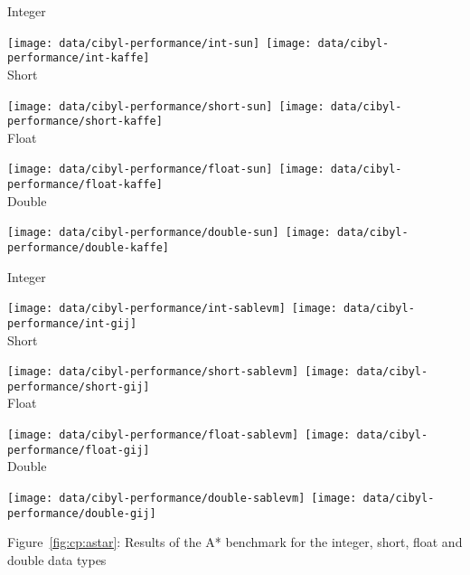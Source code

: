 \begin{figure*}[t]
  \begin{center}
    Integer

    \texttt{[image: data/cibyl-performance/int-sun]}~\texttt{[image: data/cibyl-performance/int-kaffe]}\\

    Short

    \texttt{[image: data/cibyl-performance/short-sun]}~\texttt{[image: data/cibyl-performance/short-kaffe]}\\

    Float

    \texttt{[image: data/cibyl-performance/float-sun]}~\texttt{[image: data/cibyl-performance/float-kaffe]}\\

    Double

    \texttt{[image: data/cibyl-performance/double-sun]}~\texttt{[image: data/cibyl-performance/double-kaffe]}\\
    \caption[A* benchmark results]{Results of the A* benchmark for the integer,
    short, float and double data types \emph{continued on the next page}}
    \label{fig:cp:astar}
  \end{center}
\end{figure*}

\begin{figure*}[t]
  \begin{center}
    Integer

    \texttt{[image: data/cibyl-performance/int-sablevm]}~\texttt{[image: data/cibyl-performance/int-gij]}\\

    Short

    \texttt{[image: data/cibyl-performance/short-sablevm]}~\texttt{[image: data/cibyl-performance/short-gij]}\\

    Float

    \texttt{[image: data/cibyl-performance/float-sablevm]}~\texttt{[image: data/cibyl-performance/float-gij]}\\

    Double

    \texttt{[image: data/cibyl-performance/double-sablevm]}~\texttt{[image: data/cibyl-performance/double-gij]}\\
  \begin{flushleft}
    Figure~\ref{fig:cp:astar}: Results of the A* benchmark for the integer,
    short, float and double data types
  \end{flushleft}
  \end{center}
\end{figure*}

